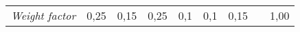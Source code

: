 \begin{table}[ht]
\begin{adjustbox}{max width=\textwidth}
\begin{tabular}{lcccccccc}
\multicolumn{1}{|c|}{\textit{Weight factor}}           & \multicolumn{1}{c|}{0,25}                  & \multicolumn{1}{c|}{0,15}               & \multicolumn{1}{c|}{0,25}                            & \multicolumn{1}{c|}{0,1}                      & \multicolumn{1}{c|}{0,1}                        & \multicolumn{1}{c|}{0,15}                      & \multicolumn{1}{c|}{}          & \multicolumn{1}{c|}{1,00}           \\ \cline{1-7} \cline{9-9} 
\end{tabular}
\end{adjustbox}
\end{table}









\newpage
